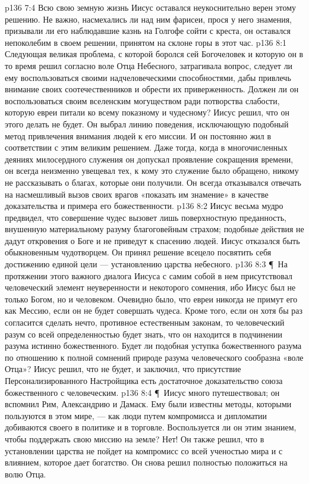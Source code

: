 \vs p136 7:4 Всю свою земную жизнь Иисус оставался неукоснительно верен этому решению. Не важно, насмехались ли над ним фарисеи, прося у него знамения, призывали ли его наблюдавшие казнь на Голгофе сойти с креста, он оставался непоколебим в своем решении, принятом на склоне горы в этот час.
\vs p136 8:1 Следующая великая проблема, с которой боролся сей Богочеловек и которую он в то время решил согласно воле Отца Небесного, затрагивала вопрос, следует ли ему воспользоваться своими надчеловеческими способностями, дабы привлечь внимание своих соотечественников и обрести их приверженность. Должен ли он воспользоваться своим вселенским могуществом ради потворства слабости, которую евреи питали ко всему показному и чудесному? Иисус решил, что он этого делать не будет. Он выбрал линию поведения, исключающую подобный метод привлечения внимания людей к его миссии. И он постоянно жил в соответствии с этим великим решением. Даже тогда, когда в многочисленных деяниях милосердного служения он допускал проявление сокращения времени, он всегда неизменно увещевал тех, к кому это служение было обращено, никому не рассказывать о благах, которые они получили. Он всегда отказывался отвечать на насмешливый вызов своих врагов «показать им знамение» в качестве доказательства и примера его божественности.
\vs p136 8:2 Иисус весьма мудро предвидел, что совершение чудес вызовет лишь поверхностную преданность, внушенную материальному разуму благоговейным страхом; подобные действия не дадут откровения о Боге и не приведут к спасению людей. Иисус отказался быть обыкновенным чудотворцем. Он принял решение всецело посвятить себя достижению единой цели --- установлению царства небесного.
\vs p136 8:3 \P\ На протяжении этого важного диалога Иисуса с самим собой в нем присутствовал человеческий элемент неуверенности и некоторого сомнения, ибо Иисус был не только Богом, но и человеком. Очевидно было, что евреи никогда не примут его как Мессию, если он не будет совершать чудеса. Кроме того, если он хотя бы раз согласится сделать нечто, противное естественным законам, то человеческий разум со всей определенностью будет знать, что он находится в подчинении разума истинно божественного. Будет ли подобная уступка божественного разума по отношению к полной сомнений природе разума человеческого сообразна «воле Отца»? Иисус решил, что не будет, и заключил, что присутствие Персонализированного Настройщика есть достаточное доказательство союза божественного с человеческим.
\vs p136 8:4 \P\ Иисус много путешествовал; он вспомнил Рим, Александрию и Дамаск. Ему были известны методы, которыми пользуются в этом мире, --- как люди путем компромисса и дипломатии добиваются своего в политике и в торговле. Воспользуется ли он этим знанием, чтобы поддержать свою миссию на земле? Нет! Он также решил, что в установлении царства не пойдет на компромисс со всей ученостью мира и с влиянием, которое дает богатство. Он снова решил полностью положиться на волю Отца.
